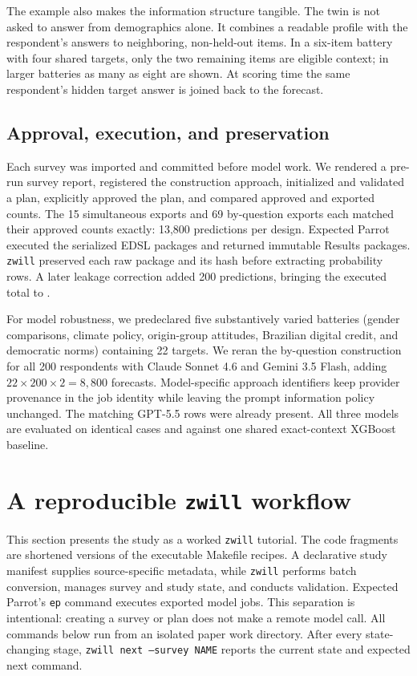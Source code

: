 \documentclass[11pt]{article}
\newcommand{\zwill}{\texttt{zwill}}
\begin{document}
The example also makes the information structure tangible. The twin is not
asked to answer from demographics alone. It combines a readable profile with
the respondent's answers to neighboring, non-held-out items. In a six-item
battery with four shared targets, only the two remaining items are eligible
context; in larger batteries as many as eight are shown. At scoring time the
same respondent's hidden target answer is joined back to the forecast.

\subsection{Approval, execution, and preservation}
Each survey was imported and committed before model work. We rendered a
pre-run survey report, registered the construction approach, initialized and
validated a plan, explicitly approved the plan, and compared approved and
exported counts. The 15 simultaneous exports and 69 by-question exports each
matched their approved counts exactly: 13,800 predictions per design. Expected
Parrot executed the serialized EDSL packages
and returned immutable Results packages. \zwill{} preserved each raw
package and its hash before extracting probability rows. A later leakage
correction added 200 predictions, bringing the executed total to
\TotalPredictions.

For model robustness, we predeclared five substantively varied batteries
(gender comparisons, climate policy, origin-group attitudes, Brazilian
digital credit, and democratic norms) containing 22 targets. We reran the
by-question construction for all 200 respondents with Claude Sonnet 4.6 and
Gemini 3.5 Flash, adding $22\times200\times2=8{,}800$ forecasts. Model-specific
approach identifiers keep provider provenance in the job identity while
leaving the prompt information policy unchanged. The matching GPT-5.5 rows
were already present. All three models are evaluated on identical cases and
against one shared exact-context XGBoost baseline.

\section{A reproducible \zwill{} workflow}
\label{sec:tutorial}
This section presents the study as a worked \zwill{} tutorial. The code
fragments are shortened versions of the executable Makefile recipes. A
declarative study manifest supplies source-specific metadata, while \zwill{}
performs batch conversion, manages survey and study state, and conducts
validation. Expected Parrot's \texttt{ep} command executes exported model jobs.
This separation is intentional: creating a survey or plan does not make
a remote model call. All commands below run from an isolated paper work
directory. After every state-changing stage, \texttt{zwill next --survey NAME}
reports the current state and expected next command.
\end{document}
